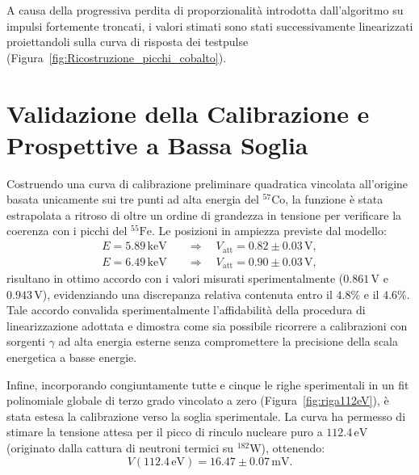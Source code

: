 A causa della progressiva perdita di proporzionalità introdotta dall'algoritmo su impulsi fortemente troncati, i valori stimati sono stati successivamente linearizzati proiettandoli sulla curva di risposta dei testpulse (Figura~\ref{fig:Ricostruzione_picchi_cobalto}).

\section*{Validazione della Calibrazione e Prospettive a Bassa Soglia}

Costruendo una curva di calibrazione preliminare quadratica vincolata all'origine basata unicamente sui tre punti ad alta energia del $^{57}\text{Co}$, la funzione è stata estrapolata a ritroso di oltre un ordine di grandezza in tensione per verificare la coerenza con i picchi del $^{55}\text{Fe}$. Le posizioni in ampiezza previste dal modello:
\begin{align}
    E = 5.89\,\text{keV} \quad &\Longrightarrow \quad V_{\text{att}} = 0.82 \pm 0.03\,\text{V}, \\
    E = 6.49\,\text{keV} \quad &\Longrightarrow \quad V_{\text{att}} = 0.90 \pm 0.03\,\text{V},
\end{align}
risultano in ottimo accordo con i valori misurati sperimentalmente ($0.861\,\text{V}$ e $0.943\,\text{V}$), evidenziando una discrepanza relativa contenuta entro il $4.8\%$ e il $4.6\%$. Tale accordo convalida sperimentalmente l'affidabilità della procedura di linearizzazione adottata e dimostra come sia possibile ricorrere a calibrazioni con sorgenti $\gamma$ ad alta energia esterne senza compromettere la precisione della scala energetica a basse energie.

Infine, incorporando congiuntamente tutte e cinque le righe sperimentali in un fit polinomiale globale di terzo grado vincolato a zero (Figura~\ref{fig:riga112eV}), è stata estesa la calibrazione verso la soglia sperimentale. La curva ha permesso di stimare la tensione attesa per il picco di rinculo nucleare puro a $112.4\,\text{eV}$ (originato dalla cattura di neutroni termici su $^{182}\text{W}$), ottenendo:
\begin{equation}
    V(112.4\,\text{eV}) = 16.47 \pm 0.07\,\text{mV}.
\end{equation}

